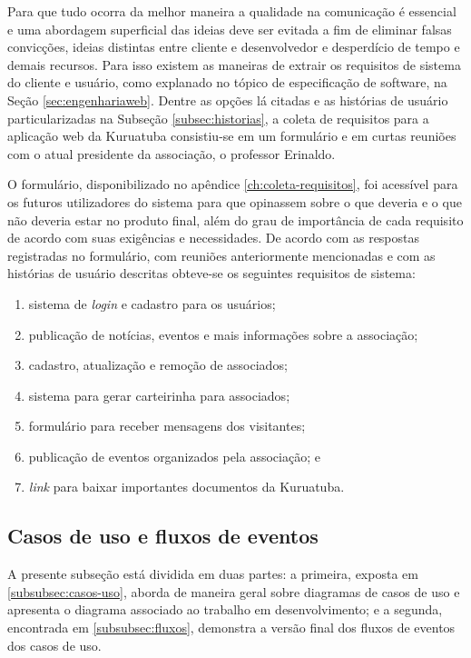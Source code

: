 Para que tudo ocorra da melhor maneira a qualidade na comunicação é essencial e uma abordagem superficial das ideias deve ser evitada a fim de eliminar falsas convicções, ideias distintas entre cliente e desenvolvedor e desperdício de tempo e demais recursos. Para isso existem as maneiras de extrair os requisitos de sistema do cliente e usuário, como explanado no tópico de especificação de software, na Seção \ref{sec:engenhariaweb}. Dentre as opções lá citadas e as histórias de usuário particularizadas na Subseção \ref{subsec:historias}, a coleta de requisitos para a aplicação web da Kuruatuba consistiu-se em um formulário e em curtas reuniões com o atual presidente da associação, o professor Erinaldo. 

O formulário, disponibilizado no apêndice \ref{ch:coleta-requisitos}, foi acessível para os futuros utilizadores do sistema para que opinassem sobre o que deveria e o que não deveria estar no produto final, além do grau de importância de cada requisito de acordo com suas exigências e necessidades. De acordo com as respostas registradas no formulário, com reuniões anteriormente mencionadas e com as histórias de usuário descritas obteve-se os seguintes requisitos de sistema:

\begin{enumerate}
 \item sistema de \textit{login} e cadastro para os usuários;
 \item publicação de notícias, eventos e mais informações sobre a associação;
 \item cadastro, atualização e remoção de associados;
 \item sistema para gerar carteirinha para associados;
 \item formulário para receber mensagens dos visitantes;
 \item publicação de eventos organizados pela associação; e
 \item \textit{link} para baixar importantes documentos da Kuruatuba.
\end{enumerate}


\hspace{2.5cm}
\subsection{Casos de uso e fluxos de eventos}
\label{subsec:usecase}
\hspace{2.5cm}

A presente subseção está dividida em duas partes: a primeira, exposta em \ref{subsubsec:casos-uso}, aborda de maneira geral sobre diagramas de casos de uso e apresenta o diagrama associado ao trabalho em desenvolvimento; e a segunda, encontrada em \ref{subsubsec:fluxos}, demonstra a versão final dos fluxos de eventos dos casos de uso.

